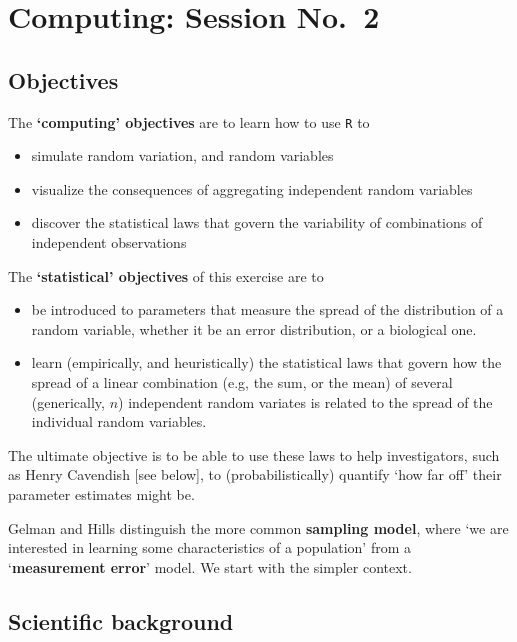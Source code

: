 \documentclass[]{book}
\begin{document}
\hypertarget{computing02}{%
\chapter{Computing: Session No.~2}\label{computing02}}

\hypertarget{objectives-4}{%
\section{Objectives}\label{objectives-4}}

The \textbf{`computing' objectives} are to learn how to use \texttt{R} to

\begin{itemize}
\item
  simulate random variation, and random variables
\item
  visualize the consequences of aggregating independent random variables\\
\item
  discover the statistical laws that govern the variability of combinations of independent observations
\end{itemize}

The \textbf{`statistical' objectives} of this exercise are to

\begin{itemize}
\item
  be introduced to parameters that measure the spread of the distribution of a random variable, whether it be an error distribution, or a biological one.
\item
  learn (empirically, and heuristically) the statistical laws that govern how the spread of a linear combination (e.g, the sum, or the mean) of several (generically, \(n\)) independent random variates is related to the spread of the individual random variables.
\end{itemize}

The ultimate objective is to be able to use these laws to help investigators, such as Henry Cavendish {[}see below{]}, to (probabilistically) quantify `how far off' their parameter estimates might be.

Gelman and Hills distinguish the more common \textbf{sampling model}, where `we are interested in learning some characteristics of a population' from a `\textbf{measurement error}' model. We start with the simpler context.

\hypertarget{scientific-background}{%
\section{Scientific background}\label{scientific-background}}
\end{document}
